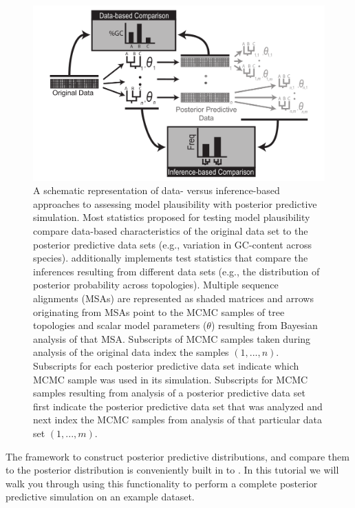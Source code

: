 \begin{figure}[t!]
\centering
\includegraphics[width=\textwidth,angle=0]{figures/brown_2014.png}
\caption{\small 
A schematic representation of data- versus inference-based approaches to assessing model plausibility with posterior predictive
simulation. Most statistics proposed for testing model plausibility compare data-based characteristics of the original data set to the posterior
    predictive data sets (e.g., variation in GC-content across species). 
    \RevBayes additionally implements test statistics that compare the inferences
    resulting from different data sets (e.g., the distribution of posterior probability across topologies). Multiple sequence alignments (MSAs) are
    represented as shaded matrices and arrows originating from MSAs point to the MCMC samples of tree topologies and scalar model parameters
    ($\theta$) resulting from Bayesian analysis of that MSA. Subscripts of MCMC samples taken during analysis of the original data index the samples $(1,
    ..., n)$. Subscripts for each posterior predictive data set indicate which MCMC sample was used in its simulation. Subscripts for MCMC samples
    resulting from analysis of a posterior predictive data set first indicate the posterior predictive data set that was analyzed and next index the
    MCMC samples from analysis of that particular data set $(1, ..., m)$.
    \label{"Figure 1"}}
\end{figure}
The framework to construct posterior predictive distributions, and compare them to the posterior distribution is 
conveniently built in to \RevBayes. In this tutorial we will walk you through using this functionality to perform
a complete posterior predictive simulation on an example dataset.  

